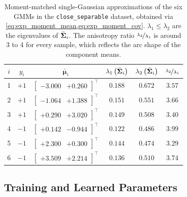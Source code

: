 \documentclass[11pt, letterpaper]{article}
\newcommand{\bSigma}{\vb{\Sigma}}
\newcommand{\bmu}{\boldsymbol{\upmu}}
\begin{document}
\begin{table}[H]
    \centering
    \caption{Moment-matched single-Gaussian approximations of the six GMMs in the \texttt{close\_separable} dataset, obtained via \cref{eq:exp_moment_mean,eq:exp_moment_cov}. $\lambda_1 \leq \lambda_2$ are the eigenvalues of $\bar{\bSigma}_i$. The anisotropy ratio $\nicefrac{\lambda_2}{\lambda_1}$ is around $3$ to $4$ for every sample, which reflects the arc shape of the component means.}
    \label{tab:exp_moment_match}
    \renewcommand{\arraystretch}{1.45}
    \begin{tabular}{@{}cccccc@{}}
        \toprule
        $i$ & $y_i$ & $\bar{\bmu}_i$ & $\lambda_1\left(\bar{\bSigma}_i\right)$ & $\lambda_2\left(\bar{\bSigma}_i\right)$ & $\nicefrac{\lambda_2}{\lambda_1}$ \\
        \midrule
        1 & $+1$ & $\begin{bmatrix} -3.000 & +0.260 \end{bmatrix}^{\intercal}$ & $0.188$ & $0.672$ & $3.57$ \\
        2 & $+1$ & $\begin{bmatrix} -1.064 & +1.388 \end{bmatrix}^{\intercal}$ & $0.151$ & $0.551$ & $3.66$ \\
        3 & $+1$ & $\begin{bmatrix} +0.290 & +3.020 \end{bmatrix}^{\intercal}$ & $0.149$ & $0.508$ & $3.40$ \\
        4 & $-1$ & $\begin{bmatrix} +0.142 & -0.944 \end{bmatrix}^{\intercal}$ & $0.122$ & $0.486$ & $3.99$ \\
        5 & $-1$ & $\begin{bmatrix} +2.300 & +0.300 \end{bmatrix}^{\intercal}$ & $0.144$ & $0.474$ & $3.29$ \\
        6 & $-1$ & $\begin{bmatrix} +3.509 & +2.214 \end{bmatrix}^{\intercal}$ & $0.136$ & $0.510$ & $3.74$ \\
        \bottomrule
    \end{tabular}
\end{table}

\subsection{Training and Learned Parameters}
\end{document}
